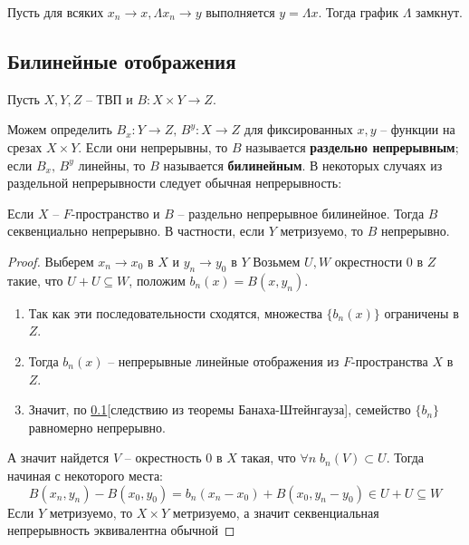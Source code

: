 \documentclass[12pt, a4paper, oneside]{book}
\begin{document}
\begin{remark}
Пусть для всяких $x_n \to x, \Lambda x_n \to y$ выполняется $y = \Lambda x$. Тогда график $\Lambda$ замкнут.
\end{remark}

\subsection{Билинейные отображения}
Пусть $X,Y,Z$ -- ТВП и $B: X\times Y \to Z$.

Можем определить $B_x:Y\to Z,\, B^y:X \to Z$ для фиксированных $x,y$ -- функции на срезах $X\times Y$.  Если они непрерывны, то $B$ называется \textbf{раздельно непрерывным}; если $B_x, \, B^y$ линейны, то $B$ называется \textbf{билинейным}.
В некоторых случаях из раздельной непрерывности следует обычная непрерывность:
\begin{theorem}
    Если $X$ -- $F$-пространство и $B$ -- раздельно непрерывное билинейное. Тогда $B$ секвенциально непрерывно. В частности, если $Y$ метризуемо, то $B$ непрерывно.
\end{theorem}
\begin{proof}
    Выберем $x_n \to x_0$ в $X$ и $y_n \to y_0$ в $Y$
Возьмем $U, W$ окрестности 0 в $Z$ такие, что $U+U \subseteq W$, положим $b_n(x) = B(x,y_n)$.
    \begin{enumerate}
        \item  Так как эти последовательности сходятся, множества $\{b_n(x)\}$ ограничены в $Z$.
        \item  Тогда $b_n(x)$ --  непрерывные линейные отображения из $F$-пространства $X$ в $Z$.
        \item  Значит, по \ref{}[следствию из теоремы Банаха-Штейнгауза], семейство $\{b_n\}$ равномерно непрерывно.
    \end{enumerate}
    А значит найдется $V$ -- окрестность 0 в $X$ такая, что $\forall n\; b_n(V) \subset U$. Тогда начиная с некоторого места:
    $$B(x_n, y_n) - B(x_0,y_0) = b_n(x_n-x_0)+B(x_0,y_n-y_0) \in U + U \subseteq W$$
    Если $Y$ метризуемо, то $X\times Y$ метризуемо, а значит секвенциальная непрерывность эквивалентна обычной
\end{proof}
    
    
\end{document}
